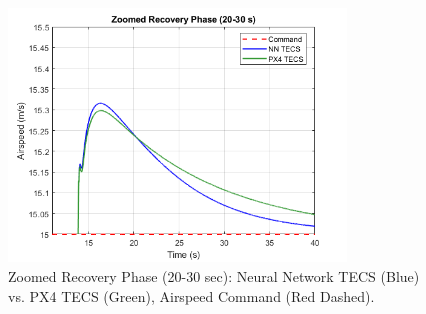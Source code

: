 \documentclass[journal,article,submit,pdftex,moreauthors]{Definitions/mdpi}
\begin{document}
\begin{figure}[H]
    \centering
    \includegraphics[width=0.8\textwidth]{zoomed_airspeed_plot.png}
    \caption{Zoomed Recovery Phase (20-30 sec): Neural Network TECS (Blue) vs. PX4 TECS (Green), Airspeed Command (Red Dashed).}
    \label{fig:zoomed_airspeed}
\end{figure}
\end{document}
